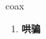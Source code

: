 
\begin{frame}
{\huge coax}
\begin{center}
\begin{enumerate}\Large
  \item \textbf{哄骗}
\end{enumerate}
\end{center}
\end{frame}

